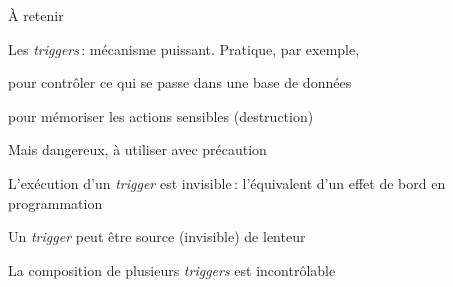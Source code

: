 \begin{frame}{À retenir}

Les \textit{triggers}\,: mécanisme puissant. Pratique, par exemple,
\vfill


\begin{redbullet}
   \item  pour contrôler ce qui se passe dans une base de données 
  \item pour mémoriser les actions sensibles (destruction)
\end{redbullet}
\vfill

Mais dangereux, à utiliser avec précaution

\begin{redbullet}
   \item L'exécution d'un \textit{trigger} est invisible\,: l'équivalent d'un
      effet de bord en programmation
   \item Un \textit{trigger}  peut être source (invisible) de lenteur
      \item La composition de plusieurs \textit{triggers} est incontrôlable
\end{redbullet}


\end{frame}
